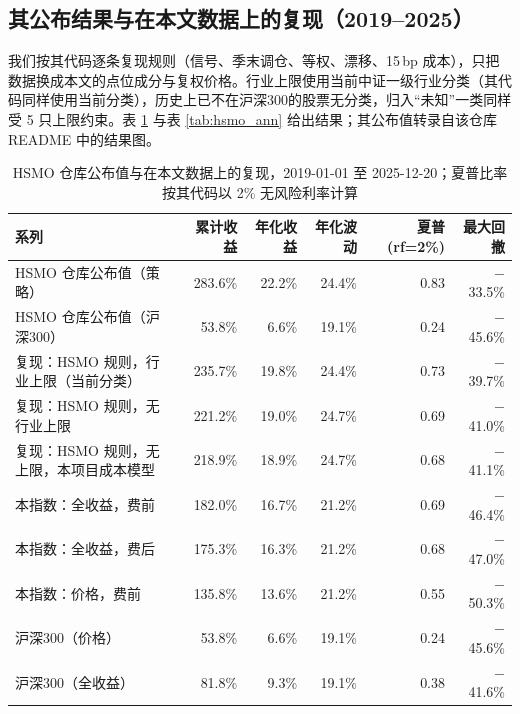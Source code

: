 \documentclass[11pt,a4paper]{article}
\begin{document}
\FloatBarrier
\subsection{其公布结果与在本文数据上的复现（2019--2025）}
我们按其代码逐条复现规则（信号、季末调仓、等权、漂移、15\,bp 成本），只把数据换成本文的点位成分与复权价格。行业上限使用当前中证一级行业分类（其代码同样使用当前分类），历史上已不在沪深300的股票无分类，归入“未知”一类同样受 5 只上限约束。表 \ref{tab:hsmo_win} 与表 \ref{tab:hsmo_ann} 给出结果；其公布值转录自该仓库 README 中的结果图。
\begin{table}[!htbp]
\centering
\footnotesize
\caption{HSMO 仓库公布值与在本文数据上的复现，2019-01-01 至 2025-12-20；夏普比率按其代码以 2\% 无风险利率计算}\label{tab:hsmo_win}
\begin{tabular}{@{}lrrrrr@{}}
\toprule
系列 & 累计收益 & 年化收益 & 年化波动 & 夏普 (rf=2\%) & 最大回撤 \\
\midrule
HSMO 仓库公布值（策略） & 283.6\% & 22.2\% & 24.4\% & 0.83 & $-$33.5\% \\
HSMO 仓库公布值（沪深300） & 53.8\% & 6.6\% & 19.1\% & 0.24 & $-$45.6\% \\
复现：HSMO 规则，行业上限（当前分类） & 235.7\% & 19.8\% & 24.4\% & 0.73 & $-$39.7\% \\
复现：HSMO 规则，无行业上限 & 221.2\% & 19.0\% & 24.7\% & 0.69 & $-$41.0\% \\
复现：HSMO 规则，无上限，本项目成本模型 & 218.9\% & 18.9\% & 24.7\% & 0.68 & $-$41.1\% \\
本指数：全收益，费前 & 182.0\% & 16.7\% & 21.2\% & 0.69 & $-$46.4\% \\
本指数：全收益，费后 & 175.3\% & 16.3\% & 21.2\% & 0.68 & $-$47.0\% \\
本指数：价格，费前 & 135.8\% & 13.6\% & 21.2\% & 0.55 & $-$50.3\% \\
沪深300（价格） & 53.8\% & 6.6\% & 19.1\% & 0.24 & $-$45.6\% \\
沪深300（全收益） & 81.8\% & 9.3\% & 19.1\% & 0.38 & $-$41.6\% \\
\bottomrule
\end{tabular}
\end{table}
\end{document}
